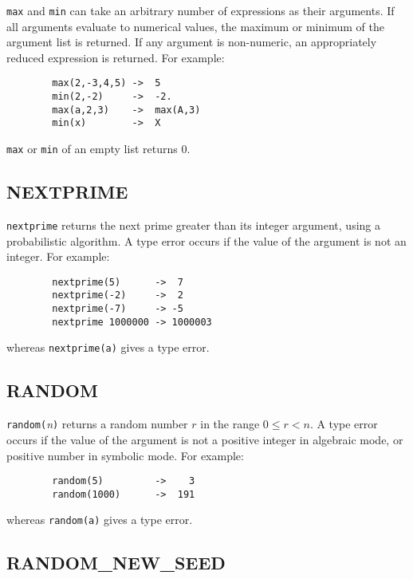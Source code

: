 \texttt{max} and \texttt{min} can take an arbitrary
number of expressions as their arguments.  If all arguments evaluate to
numerical values, the maximum or minimum of the argument list is returned.
If any argument is non-numeric, an appropriately reduced expression is
returned.  For example:
\begin{verbatim}
        max(2,-3,4,5) ->  5
        min(2,-2)     ->  -2.
        max(a,2,3)    ->  max(A,3)
        min(x)        ->  X
\end{verbatim}
\texttt{max} or \texttt{min} of an empty list returns 0.

\subsection{NEXTPRIME}
\hypertarget{operator:NEXTPRIME}{}

\texttt{nextprime} returns the next prime greater than its integer argument,
using a probabilistic algorithm.  A type error occurs if the value of the
argument is not an integer.  For example:
\begin{verbatim}
        nextprime(5)      ->  7
        nextprime(-2)     ->  2
        nextprime(-7)     -> -5
        nextprime 1000000 -> 1000003
\end{verbatim}
whereas \texttt{nextprime(a)} gives a type error.

\subsection{RANDOM}
\hypertarget{operator:RANDOM}{}

\texttt{random(}\emph{n}\texttt{)} returns a random number $r$ in the
range $0\leq r < n$.  A type error occurs if the value of the argument is not a
positive integer in algebraic mode, or positive number in symbolic mode.
For example:
\begin{verbatim}
        random(5)         ->    3
        random(1000)      ->  191
\end{verbatim}
whereas \texttt{random(a)} gives a type error.

\subsection{RANDOM\_NEW\_SEED}
\hypertarget{operator:RANDOM_NEW_SEED}{}


